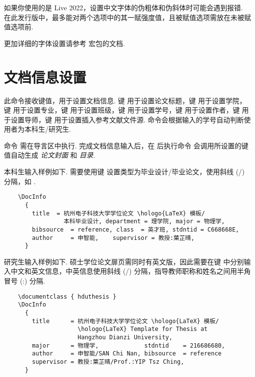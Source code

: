 如果你使用的是  Live 2022，设置中文字体的伪粗体和伪斜体时可能会遇到报错.
在此发行版中，最多能对两个选项中的其一赋强度值，且被赋值选项需放在未被赋值选项前.

更加详细的字体设置请参考  宏包的文档.

\section{文档信息设置}

\begin{function}{\DocInfo}
  \begin{syntax}
  \end{syntax}

  此命令接收键值，用于设置文档信息. 键  用于设置论文标题，键  用于设置学院，键  用于设置专业，键  用于设置班级，键  用于设置学号，键  用于设置作者，键  用于设置导师，键  用于设置插入参考文献文件源. 命令会根据输入的学号自动判断使用者为本科生/研究生.

  命令  需在导言区中执行. 完成文档信息输入后，在 \verb|| 后执行命令  会调用所设置的键值自动生成 \emph*{论文封面} 和 \emph*{目录}.
\end{function}

本科生输入样例如下. 需要使用键  设置类型为毕业设计/毕业论文，使用斜线 (/) 分隔，如 .

\begin{framed}
  \begin{verbatim}
    \DocInfo
      {
        title  = 杭州电子科技大学学位论文 \hologo{LaTeX} 模板/
                 本科毕业设计, department = 理学院, major = 物理学,
        bibsource  = reference, class  = 英才班, stdntid = C668668E,
        author     = 申智能,    supervisor = 教授:葉芷晴, 
      }
  \end{verbatim}
\end{framed}

研究生输入样例如下. 硕士学位论文扉页需同时有英文版，因此需要在键    中分别输入中文和英文信息，中英信息使用斜线 (\cmd/) 分隔，指导教师职称和姓名之间用半角冒号 (\cmd:) 分隔.

\begin{framed}
  \begin{verbatim}
    \documentclass { hduthesis }
    \DocInfo
      {
        title      = 杭州电子科技大学学位论文 \hologo{LaTeX} 模板/
                     \hologo{LaTeX} Template for Thesis at
                     Hangzhou Dianzi University,
        major      = 物理学,             stdntid    = 216686680,
        author     = 申智能/SAN Chi Nan, bibsource  = reference
        supervisor = 教授:葉芷晴/Prof.:YIP Tsz Ching,
      }
  \end{verbatim}
\end{framed}

